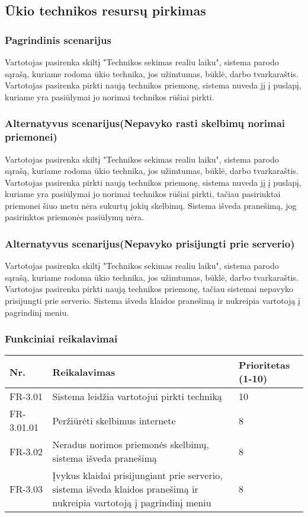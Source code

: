 \documentclass[oneside]{VUMIFPSkursinis}
\begin{document}
\subsection{Ūkio technikos resursų pirkimas}
\subsubsection{Pagrindinis scenarijus}
	Vartotojas pasirenka skiltį "Technikos sekimas realiu laiku", sistema parodo sąrašą, kuriame rodoma ūkio technika, jos užimtumas, būklė, darbo tvarkaraštis. Vartotojas pasirenka pirkti naują technikos priemonę, sistema nuveda jį į puslapį, kuriame yra pasiūlymai jo norimai technikos rūšiai pirkti.
\subsubsection{Alternatyvus scenarijus(Nepavyko rasti skelbimų norimai priemonei)}
	Vartotojas pasirenka skiltį "Technikos sekimas realiu laiku", sistema parodo sąrašą, kuriame rodoma ūkio technika, jos užimtumas, būklė, darbo tvarkaraštis. Vartotojas pasirenka pirkti naują technikos priemonę, sistema nuveda jį į puslapį, kuriame yra pasiūlymai jo norimai technikos rūšiai pirkti, tačiau pasirinktai priemonei šiuo metu nėra sukurtų jokių skelbimų. Sistema išveda pranešimą, jog pasirinktos priemonės pasiūlymų nėra.
\subsubsection{Alternatyvus scenarijus(Nepavyko prisijungti prie serverio)}
	Vartotojas pasirenka skiltį "Technikos sekimas realiu laiku", sistema parodo sąrašą, kuriame rodoma ūkio technika, jos užimtumas, būklė, darbo tvarkaraštis. Vartotojas pasirenka pirkti naują technikos priemonę, tačiau sistemai nepavyko prisijungti prie serverio. Sistema išveda klaidos pranešimą ir nukreipia vartotoją į pagrindinį meniu.
\subsubsection{Funkciniai reikalavimai}
\begin{table}[htbp]
	\begin{tabularx}{1\textwidth}{ |P{2.5cm}|X|P{3cm }| }  \hline
           	Nr. & Reikalavimas &  Prioritetas (1-10)  \\   \hline 
         	FR-3.01 & Sistema leidžia vartotojui pirkti techniką & 10  \\   \hline
		FR-3.01.01 & Peržiūrėti skelbimus internete & 8 \\ \hline
        	FR-3.02 & Neradus norimos priemonės skelbimų, sistema išveda pranešimą & 8   \\   \hline
		FR-3.03 & Įvykus klaidai prisijungiant prie serverio, sistema išveda klaidos pranešimą ir nukreipia vartotoją į pagrindinį meniu & 8 \\ \hline
	\end{tabularx}
\end{table}
\end{document}
